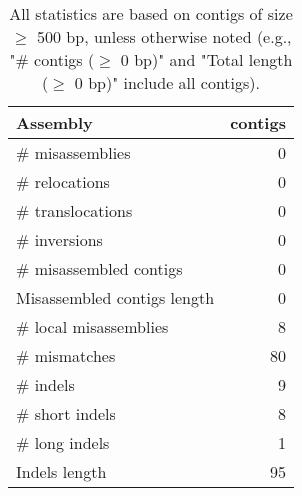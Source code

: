 \documentclass[12pt,a4paper]{article}
\begin{document}
\begin{table}[ht]
\begin{center}
\caption{All statistics are based on contigs of size $\geq$ 500 bp, unless otherwise noted (e.g., "\# contigs ($\geq$ 0 bp)" and "Total length ($\geq$ 0 bp)" include all contigs).}
\begin{tabular}{|l*{1}{|r}|}
\hline
Assembly & contigs \\ \hline
\# misassemblies & 0 \\ \hline
\hspace{5mm}\# relocations & 0 \\ \hline
\hspace{5mm}\# translocations & 0 \\ \hline
\hspace{5mm}\# inversions & 0 \\ \hline
\# misassembled contigs & 0 \\ \hline
Misassembled contigs length & 0 \\ \hline
\# local misassemblies & 8 \\ \hline
\# mismatches & 80 \\ \hline
\# indels & 9 \\ \hline
\hspace{5mm}\# short indels & 8 \\ \hline
\hspace{5mm}\# long indels & 1 \\ \hline
Indels length & 95 \\ \hline
\end{tabular}
\end{center}
\end{table}
\end{document}
